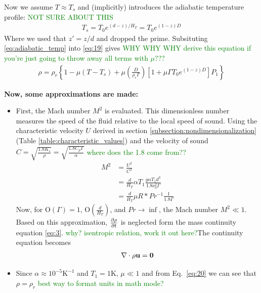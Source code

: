 \documentclass[document.tex]{subfiles}
\begin{document}
Now we assume $T \approx T_s$ and \textcite{jamc80} (implicitly) introduces the adiabatic temperature profile: \textcolor{green}{NOT SURE ABOUT THIS}
\begin{align} \label{eq:adiabatic_temp}
    T_s = T_0e^{(d-z)/H_T} = T_0 e^{(1-z)D}
\end{align}
Where we used that $z' = z/d$ and dropped the prime. 
Subsituting \eqref{eq:adiabatic_temp} into \eqref{eq:19} gives \textcolor{green}{WHY WHY WHY derive this equation if you're just going to throw away all terms with $\mu$???}
\begin{align}
    \label{eq:20}
    \rho = \rho_r\left\{1-\mu(T-T_s) + \mu\left(\frac{D}{\rho_r \Gamma}\right)[1+\mu\Gamma T_0e^{(1-z)D}]P_1\right\}
\end{align}

\textbf{Now, some approximations are made:} 
\begin{itemize}
    \item First, the Mach number $M^2$ is evaluated. This dimensionless number measures the speed of the fluid relative to the local speed of sound. 
        Using the characteristic velocity $U$ derived in section \ref{subsection:nondimensionalization} (Table \ref{table:characteristic_values}) and 
        the velocity of sound $C = \sqrt{\frac{1.8K_s}{\rho}} = \sqrt{\frac{1.8C_p\Gamma}{\alpha}}$ \textcolor{green}{where does the 1.8 come from??}  
        \begin{align*}
        M^2 &= \frac{U^2}{C^2} \\
        &= \frac{d}{H_T} \alpha T_1 \frac{g\alpha T_1 d^3}{1.8\nu_0^2\Gamma} \\
        &= \frac{d}{H_T}\mu R* Pr^{-1} \frac{1}{1.8\Gamma}
        \end{align*}
        Now, for $\mathrm{O}(\Gamma) = 1$, $\mathrm{O}(\frac{d}{H_T})$, and $Pr \to \inf$, the Mach number $M^2 \ll 1$. 
        Based on this approximation, $\pdv{\rho}{t}$ is neglected form the mass continuity equation \eqref{eq:3}. \textcolor{green}{why? isentropic relation, work it out here?}The continuity equation becomes 
        \begin{align} \label{eq:21}
        \nabla \cdot \rho \bf{u} = 0
        \end{align} 
    \item Since $\alpha \approx 10^{-5} \si{\kelvin}^{-1}$ and $T_1 = 1 \si{\kelvin}$, $\mu \ll 1$ and from Eq.~\eqref{eq:20} we can see that 
            $\rho = \rho_r$ \textcolor{green}{best way to format units in math mode?}
\end{itemize}
\end{document}
